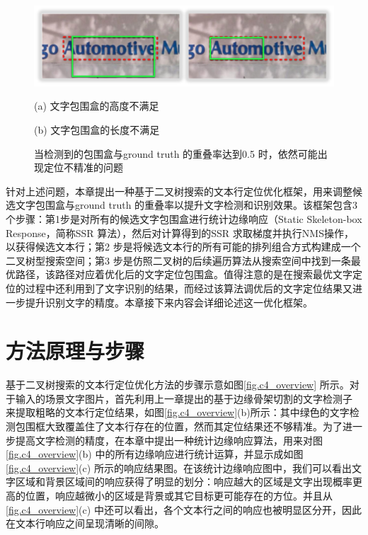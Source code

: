     \begin{figure}[!h]
    \centering
    \includegraphics[width=\textwidth]{./figures/c4_overlap.jpg}
    \begin{minipage}[t]{0.48\linewidth}
    \centerline{ \small (a) 文字包围盒的高度不满足}
    \end{minipage}
    \begin{minipage}[t]{0.48\linewidth}
    \centerline{ \small (b) 文字包围盒的长度不满足}
    \end{minipage}
    \caption{当检测到的包围盒与ground truth 的重叠率达到0.5 时，依然可能出现定位不精准的问题}
    \label{fig.c4_overlap}
    \end{figure}

    针对上述问题，本章提出一种基于二叉树搜索的文本行定位优化框架，用来调整候选文字包围盒与ground truth 的重叠率以提升文字检测和识别效果。该框架包含3个步骤：第1步是对所有的候选文字包围盒进行统计边缘响应（Static Skeleton-box Response，简称SSR 算法），然后对计算得到的SSR 求取梯度并执行NMS操作，以获得候选文本行；第2 步是将候选文本行的所有可能的排列组合方式构建成一个二叉树型搜索空间；第3 步是仿照二叉树的后续遍历算法从搜索空间中找到一条最优路径，该路径对应着优化后的文字定位包围盒。值得注意的是在搜索最优文字定位的过程中还利用到了文字识别的结果，而经过该算法调优后的文字定位结果又进一步提升识别文字的精度。本章接下来内容会详细论述这一优化框架。

    \section{方法原理与步骤}

    基于二叉树搜索的文本行定位优化方法的步骤示意如图\ref{fig.c4_overview} 所示。对于输入的场景文字图片，首先利用上一章提出的基于边缘骨架切割的文字检测子\cite{He2017scene} 来提取粗略的文本行定位结果，如图\ref{fig.c4_overview}(b)所示：其中绿色的文字检测包围框大致覆盖住了文本行存在的位置，然而其定位结果还不够精准。为了进一步提高文字检测的精度，在本章中提出一种统计边缘响应算法，用来对图\ref{fig.c4_overview}(b) 中的所有边缘响应进行统计运算，并显示成如图\ref{fig.c4_overview}(c) 所示的响应结果图。在该统计边缘响应图中，我们可以看出文字区域和背景区域间的响应获得了明显的划分：响应越大的区域是文字出现概率更高的位置，响应越微小的区域是背景或其它目标更可能存在的方位。并且从\ref{fig.c4_overview}(c) 中还可以看出，各个文本行之间的响应也被明显区分开，因此在文本行响应之间呈现清晰的间隙。

